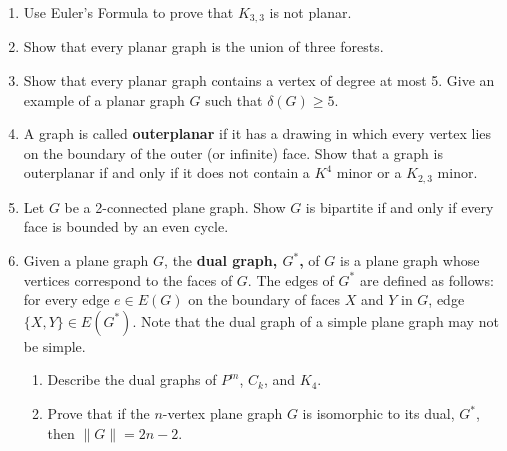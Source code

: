 \documentclass[12pt]{article}
\renewcommand{\emph}[1]{\textsf{\textbf{#1}}}
\begin{document}
\begin{enumerate}
	\item Use Euler's Formula to prove that $K_{3,3}$ is not planar.
	\item Show that every planar graph is the union of three forests. 
	\item Show that every planar graph contains a vertex of degree at most 5. Give an example of a planar graph $G$ such that $\delta(G) \geq 5.$
	\item A graph is called \emph{outerplanar} if it has a drawing in which every vertex lies on the boundary of the outer (or infinite) face. Show that a graph is outerplanar if and only if it does not contain a $K^4$ minor or a $K_{2,3}$ minor.
	\item Let $G$ be a 2-connected plane graph. Show $G$ is bipartite if and only if every face is bounded by an even cycle.
	\item Given a plane graph $G$, the \emph{dual graph, $G^*$,} of $G$ is a plane graph whose vertices correspond to the faces of $G$. The edges of $G^*$ are defined as follows: for every edge $e \in E(G)$ on the boundary of faces $X$ and $Y$ in $G$, edge $\{X,Y\} \in E(G^*).$ Note that the dual graph of a simple plane graph may not be simple.
	\begin{enumerate}
	\item Describe the dual graphs of $P^m$, $C_k$, and $K_4.$
	\item Prove that if the $n$-vertex plane graph $G$ is isomorphic to its dual, $G^*$, then $\parallel G \parallel = 2n-2.$
	\end{enumerate}
\end{enumerate}
\end{document}
